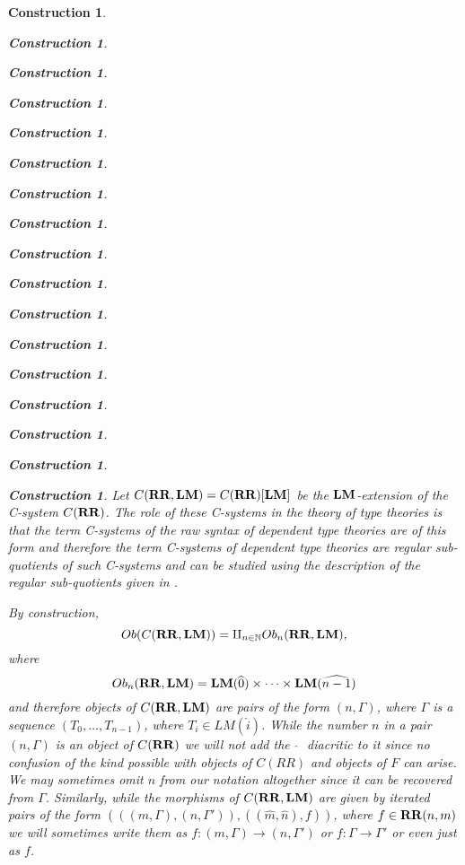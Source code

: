 \documentclass[onecolumn,12pt]{amsart}
\numberwithin{proposition}{subsection}
\newtheorem{construction}[proposition]{Construction}
\newcommand{\sr}{\rightarrow}
\newcommand{\nn}{{\mathbb N}}
\newcommand{\nat}{\nn}
\newcommand{\wh}{\widehat}
\newcommand{\RR}{{\bf RR}}
\newcommand{\LM}{{\bf LM}}
\begin{document}
\begin{construction}
\begin{construction}
\begin{construction}
\begin{construction}
\begin{construction}
\begin{construction}
\begin{construction}
\begin{construction}
\begin{construction}
\begin{construction}
\begin{construction}
\begin{construction}
\begin{construction}
\begin{construction}
\begin{construction}
\begin{construction}
\begin{construction}
Let $C(\RR,\LM)=C(\RR)[\LM]$ be the $\LM$-extension of the C-system
$C(\RR)$. The role of these C-systems in the theory of type theories is that
the term C-systems of the raw syntax of dependent type theories are of this
form and therefore the term C-systems of dependent type theories are regular
sub-quotients of such C-systems and can be studied using the description of the
regular sub-quotients given in \cite{Csubsystems}.

By construction,
%
\begin{equation}\label{2016.01.21.eq3}
Ob(C(\RR,\LM))=\amalg_{n\in\nat}Ob_n(\RR,\LM),
\end{equation}%
%
where 
%
$$Ob_n(\RR,\LM)=\LM(\wh{0})\times\dots\times\LM(\wh{n-1})$$
%
and therefore objects of $C(\RR,\LM)$ are pairs of the form $(n,\Gamma)$, where
$\Gamma$ is a sequence $(T_0,\dots,T_{n-1})$, where $T_i\in LM(\wh{i})$. While
the number $n$ in a pair $(n,\Gamma)$ is an object of $C(\RR)$ we will not add
the ${\,\,\wh{}\,\,}$ diacritic to it since no confusion of the kind possible
with objects of $C(RR)$ and objects of $F$ can arise. We may sometimes omit $n$
from our notation altogether since it can be recovered from
$\Gamma$. Similarly, while the morphisms of $C(\RR,\LM)$ are given by iterated
pairs of the form $(((m,\Gamma),(n,\Gamma')),((\wh{m},\wh{n}),f))$, where $f\in
\RR(n,m)$ we will sometimes write them as $f:(m,\Gamma)\sr (n,\Gamma')$ or
$f:\Gamma\sr \Gamma'$ or even just as $f$.


\end{construction}
\end{construction}
\end{construction}
\end{construction}
\end{construction}
\end{construction}
\end{construction}
\end{construction}
\end{construction}
\end{construction}
\end{construction}
\end{construction}
\end{construction}
\end{construction}
\end{construction}
\end{construction}
\end{construction}
\end{document}
